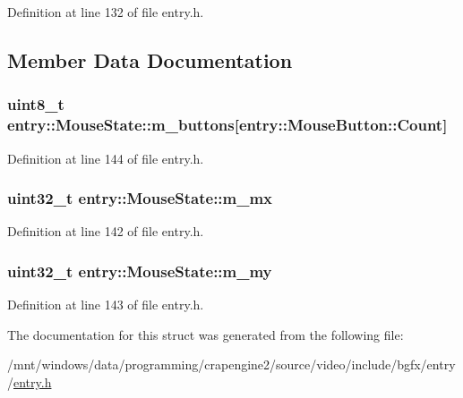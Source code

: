 Definition at line 132 of file entry.\+h.



\subsection{Member Data Documentation}
\hypertarget{structentry_1_1_mouse_state_af8e88110d4406f24f8c4f900d857d2a6}{
\subsubsection[{m\+\_\+buttons}]{\setlength{\rightskip}{0pt plus 5cm}uint8\+\_\+t entry\+::\+Mouse\+State\+::m\+\_\+buttons\mbox{[}{\bf entry\+::\+Mouse\+Button\+::\+Count}\mbox{]}}}\label{structentry_1_1_mouse_state_af8e88110d4406f24f8c4f900d857d2a6}


Definition at line 144 of file entry.\+h.

\hypertarget{structentry_1_1_mouse_state_aea2e31295c99f374019ac7585c2bacca}{
\subsubsection[{m\+\_\+mx}]{\setlength{\rightskip}{0pt plus 5cm}uint32\+\_\+t entry\+::\+Mouse\+State\+::m\+\_\+mx}}\label{structentry_1_1_mouse_state_aea2e31295c99f374019ac7585c2bacca}


Definition at line 142 of file entry.\+h.

\hypertarget{structentry_1_1_mouse_state_ab02ed1e8be6819e43a88392e34a92e1c}{
\subsubsection[{m\+\_\+my}]{\setlength{\rightskip}{0pt plus 5cm}uint32\+\_\+t entry\+::\+Mouse\+State\+::m\+\_\+my}}\label{structentry_1_1_mouse_state_ab02ed1e8be6819e43a88392e34a92e1c}


Definition at line 143 of file entry.\+h.



The documentation for this struct was generated from the following file\+:\begin{DoxyCompactItemize}
\item 
/mnt/windows/data/programming/crapengine2/source/video/include/bgfx/entry/\hyperlink{entry_8h}{entry.\+h}\end{DoxyCompactItemize}
